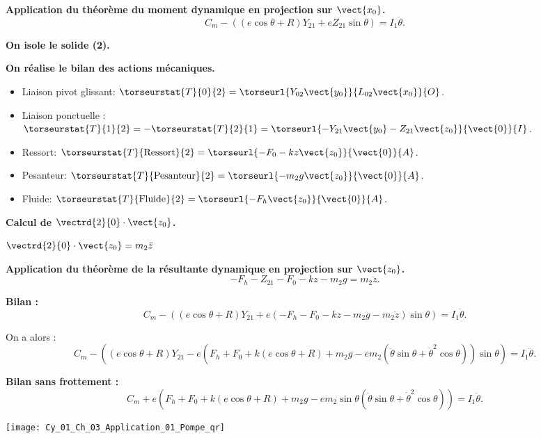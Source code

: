 \textbf{Application du théorème du moment dynamique en projection sur $\vect{x_0}$.}
$$
C_m-\left(\left(e\cos\theta+R\right)Y_{21} +e Z_{21}\sin\theta\right) =I_1\ddot{\theta}.
$$

\textbf{On isole le solide \textbf{(2)}.}

\textbf{On réalise le bilan des actions mécaniques.}
\begin{itemize}
\item Liaison pivot glissant: $\torseurstat{T}{0}{2}
=\torseurl{Y_{02}\vect{y_0}}{L_{02}\vect{x_0}}{O}$.
\item Liaison ponctuelle : $\torseurstat{T}{1}{2}=-\torseurstat{T}{2}{1}
=\torseurl{-Y_{21}\vect{y_0}-Z_{21}\vect{z_0}}{\vect{0}}{I}$. 
\item Ressort: $\torseurstat{T}{\text{Ressort}}{2}
=\torseurl{-F_0-kz\vect{z_0}}{\vect{0}}{A}$.
\item Pesanteur: $\torseurstat{T}{\text{Pesanteur}}{2}
=\torseurl{-m_2g\vect{z_0}}{\vect{0}}{A}$.
\item Fluide: $\torseurstat{T}{\text{Fluide}}{2}
=\torseurl{-F_h\vect{z_0}}{\vect{0}}{A}$.

\end{itemize}

\textbf{Calcul de $\vectrd{2}{0}\cdot \vect{z_0}$.}
 
$\vectrd{2}{0}\cdot \vect{z_0}=m_2\ddot{z}$

\textbf{Application du théorème de la résultante dynamique en projection sur $\vect{z_0}$.}
$$
-F_h-Z_{21}-F_0-kz-m_2g=m_2\ddot{z}.
$$


\textbf{Bilan :}
$$C_m-\left(\left(e\cos\theta+R\right)Y_{21} +e \left( -F_h-F_0-kz-m_2g-m_2\ddot{z}\right)\sin\theta\right) =I_1\ddot{\theta}.$$

On a alors :
$$C_m-\left(\left(e\cos\theta+R\right)Y_{21} -e \left( F_h+F_0+k\left( e\cos\theta+R \right)+m_2g-em_2\left( \ddot{\theta}\sin\theta+\dot{\theta}^2\cos\theta\right)\right)\sin\theta\right) =I_1\ddot{\theta}.$$


\textbf{Bilan sans frottement :}
$$C_m+e\left(
F_h+F_0+k\left( e\cos\theta+R \right)+m_2g
-em_2\sin\theta\left( \ddot{\theta}\sin\theta+\dot{\theta}^2\cos\theta\right)
\right) =I_1\ddot{\theta}.$$
\else
\fi

\ifprof
\else
\begin{marginfigure}
\centering
\texttt{[image: Cy\_01\_Ch\_03\_Application\_01\_Pompe\_qr]}
\end{marginfigure}
\fi